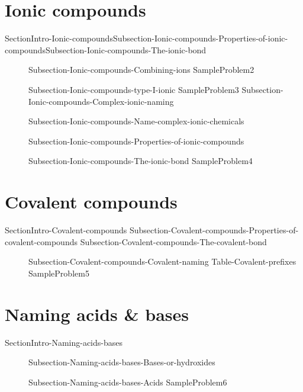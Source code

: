 \documentclass[main.tex]{subfiles}
\newcommand\chapterlabel{Ch-naming}\setcounter{figurenewcounter}{0}\setcounter{tablenewcounter}{0}\setcounter{formulanewcounter}{0}\chapterpicture{../{\chapterlabel}/figure1}\chapterpicturelabel{Pixnio}
\begin{document}
\section{Ionic compounds}
{SectionIntro-Ionic-compounds}{Subsection-Ionic-compounds-Properties-of-ionic-compounds}{Subsection-Ionic-compounds-The-ionic-bond}
\sloppy \begin{description}
\item[]{Subsection-Ionic-compounds-Combining-ions}
{SampleProblem2}
\item[]{Subsection-Ionic-compounds-type-I-ionic}
{SampleProblem3}
{Subsection-Ionic-compounds-Complex-ionic-naming}
\item[]{Subsection-Ionic-compounds-Name-complex-ionic-chemicals}
\item[]{Subsection-Ionic-compounds-Properties-of-ionic-compounds}
\item[]{Subsection-Ionic-compounds-The-ionic-bond}
{SampleProblem4}
\end{description}

\section{Covalent compounds}{SectionIntro-Covalent-compounds}
{Subsection-Covalent-compounds-Properties-of-covalent-compounds}
{Subsection-Covalent-compounds-The-covalent-bond}
\sloppy \begin{description}
\item[]{Subsection-Covalent-compounds-Covalent-naming}
 {Table-Covalent-prefixes}	
{SampleProblem5}
\end{description}

\section{Naming acids \& bases}
{SectionIntro-Naming-acids-bases}
\sloppy \begin{description}
\item[]{Subsection-Naming-acids-bases-Bases-or-hydroxides}
\item[]{Subsection-Naming-acids-bases-Acids}
{SampleProblem6}
\end{description}
\end{document}
